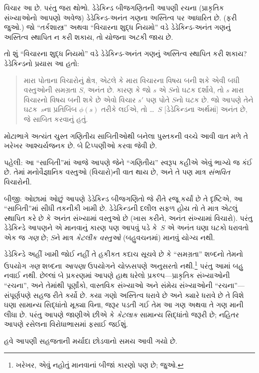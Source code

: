 વિચાર આ છે. પરંતુ જરા થોભો. ડેડેકિન્ડ બીજગણિતની આપણી રચના
(પ્રાકૃતિક સંખ્યાઓનો આપણો અવેજ) ડેડેકિન્ડ-અનંત ગણના અસ્તિત્વ પર
આધારિત છે. (ફરી 
જુઓ.) જો ``તર્કશાસ્ત્ર'' અથવા ``વિચારના શુદ્ધ નિયમો'' વડે
ડેડેકિન્ડ-અનંત ગણનું અસ્તિત્વ સ્થાપિત ન કરી શકાય, તો યોજના અટકી જાય છે.

તો શું ``વિચારના શુદ્ધ નિયમો'' વડે ડેડેકિન્ડ-અનંત ગણનું અસ્તિત્વ
સ્થાપિત કરી શકાય? ડેડેકિન્ડનો પ્રયાસ આ હતો:
\begin{quote}
  મારા પોતાના વિચારોનું ક્ષેત્ર, એટલે કે મારા વિચારના વિષય બની શકે
  એવી બધી વસ્તુઓની સમગ્રતા $S$, અનંત છે. કારણ કે જો $s$ એ $S$નો
  ઘટક દર્શાવે, તો $s$ મારા વિચારનો વિષય બની શકે છે એવો વિચાર $s'$ પણ
  પોતે $S$નો ઘટક છે. જો આપણે તેને ઘટક~$s$ના પ્રતિબિંબ $\phi(s)$ તરીકે
  લઈએ, તો \dots~$S$ [ડેડેકિન્ડના અર્થમાં] અનંત છે, જે સાબિત કરવાનું હતું.
	\citep[\S66]{Dedekind1888}
\end{quote}
મોટાભાગે અત્યંત ચુસ્ત ગણિતીય સાબિતીઓથી બનેલા પુસ્તકની વચ્ચે આવી વાત
મળે તે ખરેખર આશ્ચર્યજનક છે. બે ટિપ્પણીઓ કરવા જેવી છે.

પહેલી: આ ``સાબિતી''માં આજે આપણે જેને ``ગણિતીય'' સ્વરૂપ કહીએ એવું
ભાગ્યે જ કંઈ છે. તેમાં મનોવૈજ્ઞાનિક વસ્તુઓ (વિચારો)ની વાત થાય છે, અને
તે પણ માત્ર \emph{સંભવિત} વિચારોની.

બીજી: ઓછામાં ઓછું આપણે ડેડેકિન્ડ બીજગણિતો જે રીતે રજૂ કર્યાં છે તે
દૃષ્ટિએ, આ ``સાબિતી''માં સીધી તકનીકી ખામી છે. ડેડેકિન્ડની દલીલ સફળ
હોય તો તે માત્ર એટલું સ્થાપિત કરે છે કે અનંત સંખ્યામાં વસ્તુઓ છે
(ખાસ કરીને, અનંત સંખ્યામાં વિચારો). પરંતુ ડેડેકિન્ડે આપણને એ માનવાનું
કારણ પણ આપવું પડે કે~$S$ એ અનંત ઘણા ઘટકો ધરાવતો એક જ
\emph{ગણ} છે; $S$ને માત્ર \emph{કેટલીક વસ્તુઓ} (બહુવચનમાં) માનવું
યોગ્ય નથી.

ડેડેકિન્ડે અહીં ખામી જોઈ નહીં તે હકીકત કદાચ સૂચવે છે કે
``સમગ્રતા'' શબ્દનો તેમનો ઉપયોગ \emph{ગણ} શબ્દના \emph{આપણા} ઉપયોગને
ચોક્કસપણે અનુસરતો નથી.\footnote{ખરેખર, એવું નહોતું માનવાનાં બીજાં
કારણો પણ છે; \citet[p.~23]{Potter2004} જુઓ.} પરંતુ આમાં બહુ નવાઈ નથી.
છેલ્લાં બે પ્રકરણમાં આપણે હાથ ધરેલો પ્રકલ્પ---પ્રાકૃતિક સંખ્યાઓની
``રચના'', અને તેમાંથી પૂર્ણાંકો, વાસ્તવિક સંખ્યાઓ અને સંમેય સંખ્યાઓની
``રચના''---સંપૂર્ણપણે સહજ રીતે કર્યો છે. કયા ગણો અસ્તિત્વ ધરાવે છે અને
ક્યારે ધરાવે છે તે વિશે ઘણા સામાન્ય સિદ્ધાંતો મૂક્યા વિના, જરૂર પડતી
ગઈ તેમ આ ગણ અથવા તે ગણ માની લીધા છે. પરંતુ આપણે જાણીએ છીએ કે
\emph{કેટલાક} સામાન્ય સિદ્ધાંતો જરૂરી છે; નહિતર આપણે રસેલના
વિરોધાભાસમાં ફસાઈ જઈશું.

 હવે આપણી સહજતાની મર્યાદા છોડવાનો સમય આવી ગયો છે.
\endgroup

